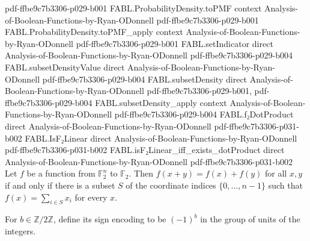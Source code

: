 \begin{theorem}
  {pdf-ffbe9c7b3306-p029-b001}
\proofstep
  {FABL.ProbabilityDensity.toPMF}
  {context}
  {Analysis-of-Boolean-Functions-by-Ryan-ODonnell}
  {pdf-ffbe9c7b3306-p029-b001}
\proofstep
  {FABL.ProbabilityDensity.toPMF_apply}
  {context}
  {Analysis-of-Boolean-Functions-by-Ryan-ODonnell}
  {pdf-ffbe9c7b3306-p029-b001}
\proofstep
  {FABL.setIndicator}
  {direct}
  {Analysis-of-Boolean-Functions-by-Ryan-ODonnell}
  {pdf-ffbe9c7b3306-p029-b004}
\proofstep
  {FABL.subsetDensityValue}
  {direct}
  {Analysis-of-Boolean-Functions-by-Ryan-ODonnell}
  {pdf-ffbe9c7b3306-p029-b004}
\proofstep
  {FABL.subsetDensity}
  {direct}
  {Analysis-of-Boolean-Functions-by-Ryan-ODonnell}
  {pdf-ffbe9c7b3306-p029-b001,
    pdf-ffbe9c7b3306-p029-b004}
\proofstep
  {FABL.subsetDensity_apply}
  {context}
  {Analysis-of-Boolean-Functions-by-Ryan-ODonnell}
  {pdf-ffbe9c7b3306-p029-b004}
\proofstep
  {FABL.f₂DotProduct}
  {direct}
  {Analysis-of-Boolean-Functions-by-Ryan-ODonnell}
  {pdf-ffbe9c7b3306-p031-b002}
\proofstep
  {FABL.IsF₂Linear}
  {direct}
  {Analysis-of-Boolean-Functions-by-Ryan-ODonnell}
  {pdf-ffbe9c7b3306-p031-b002}
\proofstep
  {FABL.isF₂Linear_iff_exists_dotProduct}
  {direct}
  {Analysis-of-Boolean-Functions-by-Ryan-ODonnell}
  {pdf-ffbe9c7b3306-p031-b002}
Let $f$ be a function from $\mathbb{F}_2^n$ to $\mathbb{F}_2$. Then $f(x+y)=f(x)+f(y)$ for all $x,y$ if and only if there is a subset $S$ of the
coordinate indices $\{0,\ldots,n-1\}$ such that $f(x)=\sum_{i\in S}x_i$ for every $x$.
\end{theorem}

\begin{definition}
\label{FABL.signEncode}
\leanok
{}
For $b\in\mathbb{Z}/2\mathbb{Z}$, define its sign encoding to be $(-1)^b$ in the group
of units of the integers.
\end{definition}

